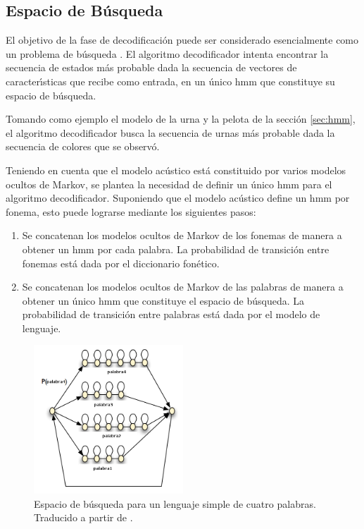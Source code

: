 \subsection{Espacio de B\'usqueda}
El objetivo de la fase de decodificaci\'on puede ser considerado esencialmente como un problema de 
b\'usqueda \cite{huang-handbook10}.
El algoritmo decodificador intenta encontrar la secuencia de estados m\'as probable dada la secuencia de
vectores de caracter{\'\i}sticas que recibe como entrada, en un \'unico \gls{hmm} que constituye su 
espacio de b\'usqueda.

Tomando como ejemplo el modelo de la urna y la pelota de la secci\'on \ref{sec:hmm}, el 
algoritmo decodificador busca la secuencia de urnas m\'as probable dada la secuencia de colores 
que se observ\'o.

Teniendo en cuenta que el modelo ac\'ustico est\'a constituido por varios modelos ocultos de Markov,
se plantea la necesidad de definir un \'unico \gls{hmm} para el algoritmo decodificador. Suponiendo que 
el modelo ac\'ustico define un \gls{hmm} por fonema, esto puede lograrse mediante los siguientes pasos:

\begin{enumerate}
	\item Se concatenan los modelos ocultos de Markov de los fonemas de manera a obtener un \gls{hmm} 
	por cada palabra. 
	La probabilidad de transici\'on entre fonemas est\'a dada por el diccionario fon\'etico.
	\item Se concatenan los modelos ocultos de Markov de las palabras de manera a obtener un \'unico 
	\gls{hmm} que constituye el espacio de b\'usqueda. La probabilidad de transici\'on entre palabras 
	est\'a dada por el modelo de lenguaje.
\end{enumerate}

\begin{figure}[H] 
\centering
\includegraphics[width=0.5\textwidth]{./graphics/espacio.png}
\caption{Espacio de b\'usqueda para un lenguaje simple de cuatro palabras. Traducido a partir de \cite{RenalsSearch}.}
\label{figure:espacio-busqueda}
\end{figure}



